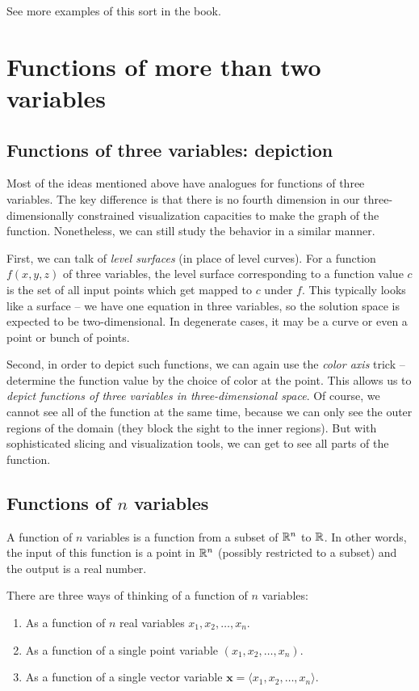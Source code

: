 \documentclass[10pt]{amsart}
\begin{document}
See more examples of this sort in the book.

\section{Functions of more than two variables}

\subsection{Functions of three variables: depiction}

Most of the ideas mentioned above have analogues for functions of
three variables. The key difference is that there is no fourth
dimension in our three-dimensionally constrained visualization
capacities to make the graph of the function. Nonetheless, we can
still study the behavior in a similar manner.

First, we can talk of {\em level surfaces} (in place of level
curves). For a function $f(x,y,z)$ of three variables, the level
surface corresponding to a function value $c$ is the set of all input
points which get mapped to $c$ under $f$. This typically looks like a
surface -- we have one equation in three variables, so the solution
space is expected to be two-dimensional. In degenerate cases, it may
be a curve or even a point or bunch of points.

Second, in order to depict such functions, we can again use the {\em
color axis} trick -- determine the function value by the choice of
color at the point. This allows us to {\em depict functions of three
variables in three-dimensional space}. Of course, we cannot see all of
the function at the same time, because we can only see the outer
regions of the domain (they block the sight to the inner regions). But
with sophisticated slicing and visualization tools, we can get to see
all parts of the function.

\subsection{Functions of $n$ variables}

A function of $n$ variables is a function from a subset of $\mathbb{R}^n$ to
$\mathbb{R}$. In other words, the input of this function is a point in $\mathbb{R}^n$
(possibly restricted to a subset) and the output is a real number.

There are three ways of thinking of a function of $n$ variables:

\begin{enumerate}
\item As a function of $n$ real variables $x_1, x_2, \dots, x_n$.
\item As a function of a single point variable $(x_1,x_2,\dots,x_n)$.
\item As a function of a single vector variable $\mathbf{x} = \langle
  x_1, x_2, \dots, x_n \rangle$.
\end{enumerate}
\end{document}
